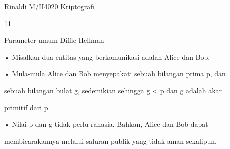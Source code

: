 \documentclass{article}
\begin{document}

Rinaldi M/II4020 Kriptografi

11

Parameter umum Diffie-Hellman

• Misalkan dua entitas yang berkomunikasi adalah Alice dan Bob.

• Mula-mula Alice dan Bob menyepakati sebuah bilangan prima p, dan 

sebuah bilangan bulat g, sedemikian sehingga g < p dan g adalah akar 

primitif dari p.

• Nilai p dan g tidak perlu rahasia. Bahkan, Alice dan Bob dapat 

membicarakannya melalui saluran publik yang tidak aman sekalipun.
\end{document}
